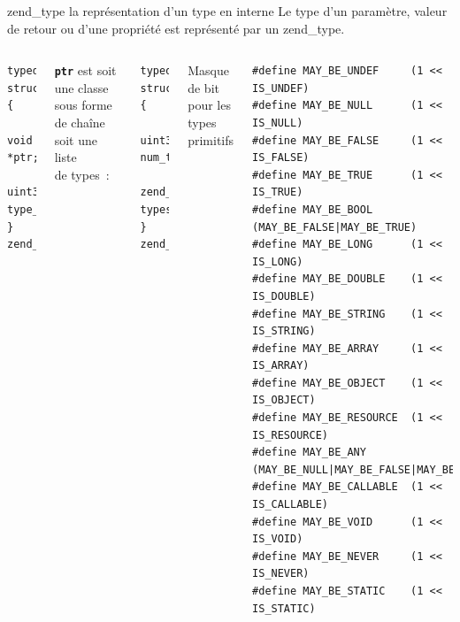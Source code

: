\documentclass[10pt]{beamer}
\begin{document}
\begin{frame}[fragile]{zend\_type la représentation d'un type en interne}
    Le type d'un paramètre, valeur de retour ou d'une propriété est représenté par un \alert{zend\_type}.
    \begin{columns}[T,onlytextwidth]
            \begin{verbatim}
typedef struct {
  void *ptr;
  uint32_t type_mask;
} zend_type;
            \end{verbatim}
            \texttt{\textbf{ptr}} est soit une classe sous forme de chaîne
            soit une liste \\de types~:
            \begin{verbatim}
typedef struct {
  uint32_t num_types;
  zend_type types[1];
} zend_type_list;
            \end{verbatim}
    
            Masque de bit pour les types primitifs
            \begin{verbatim}
#define MAY_BE_UNDEF     (1 << IS_UNDEF)
#define MAY_BE_NULL      (1 << IS_NULL)
#define MAY_BE_FALSE     (1 << IS_FALSE)
#define MAY_BE_TRUE      (1 << IS_TRUE)
#define MAY_BE_BOOL      (MAY_BE_FALSE|MAY_BE_TRUE)
#define MAY_BE_LONG      (1 << IS_LONG)
#define MAY_BE_DOUBLE    (1 << IS_DOUBLE)
#define MAY_BE_STRING    (1 << IS_STRING)
#define MAY_BE_ARRAY     (1 << IS_ARRAY)
#define MAY_BE_OBJECT    (1 << IS_OBJECT)
#define MAY_BE_RESOURCE  (1 << IS_RESOURCE)
#define MAY_BE_ANY       (MAY_BE_NULL|MAY_BE_FALSE|MAY_BE_TRUE|MAY_BE_LONG|MAY_BE_DOUBLE|MAY_BE_STRING|MAY_BE_ARRAY|MAY_BE_OBJECT|MAY_BE_RESOURCE)
#define MAY_BE_CALLABLE  (1 << IS_CALLABLE)
#define MAY_BE_VOID      (1 << IS_VOID)
#define MAY_BE_NEVER     (1 << IS_NEVER)
#define MAY_BE_STATIC    (1 << IS_STATIC)
            \end{verbatim}
    \end{columns}
\end{frame}
\end{document}
